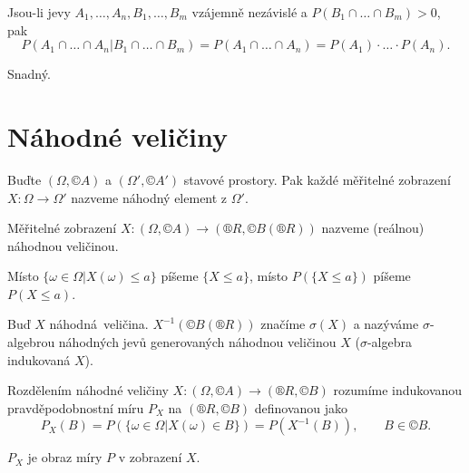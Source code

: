 \documentclass[12pt]{article}					%
\begin{document}
\begin{veta}
	Jsou-li jevy $A_1, …, A_n, B_1, …, B_m$ vzájemně nezávislé a $P(B_1 \cap … \cap B_m) > 0$, pak
	$$ P(A_1 \cap … \cap A_n|B_1 \cap … \cap B_m) = P(A_1 \cap … \cap A_n) = P(A_1)·…·P(A_n). $$

	\begin{dukazin}
		Snadný.
	\end{dukazin}
\end{veta}

\section{Náhodné veličiny}
\begin{definice}
	Buďte $(\Omega, ©A)$ a $(\Omega', ©A')$ stavové prostory. Pak každé měřitelné zobrazení $X: \Omega \rightarrow \Omega'$ nazveme náhodný element z $\Omega'$.
\end{definice}

\begin{definice}
	Měřitelné zobrazení $X: (\Omega, ©A) \rightarrow (®R, ©B(®R))$ nazveme (reálnou) náhodnou veličinou.
\end{definice}

\begin{definice}[Značení]
	Místo $\{\omega \in \Omega | X(\omega) ≤ a\}$ píšeme $\{X ≤ a\}$, místo $P(\{X ≤ a\})$ píšeme $P(X ≤ a)$.
\end{definice}

\begin{definice}
	Buď $X$ náhodná veličina. $X^{-1}(©B(®R))$ značíme $\sigma(X)$ a nazýváme $\sigma$-algebrou náhodných jevů generovaných náhodnou veličinou $X$ ($\sigma$-algebra indukovaná $X$).
\end{definice}


\begin{definice}
	Rozdělením náhodné veličiny $X: (\Omega, ©A) \rightarrow (®R, ©B)$ rozumíme indukovanou pravděpodobnostní míru $P_X$ na $(®R, ©B)$ definovanou jako
	$$ P_X(B) = P(\{\omega \in \Omega | X(\omega) \in B\}) = P(X^{-1}(B)), \qquad B \in ©B. $$

	\begin{poznamkain}
		$P_X$ je obraz míry $P$ v zobrazení $X$.
	\end{poznamkain}
\end{definice}
\end{document}
